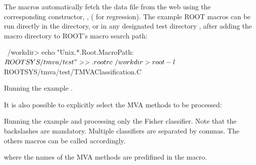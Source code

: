 The macros automatically fetch the data file from 
the web using the corresponding  constructor, \eg,
 ( for regression). The example %
ROOT macros can be run directly in the  directory,
or in any designated test directory , after adding the macro directory 
to ROOT's macro search path:
\begin{codeexample}
\begin{tmvacode}
~/workdir> echo "Unix.*.Root.MacroPath: $ROOTSYS/tmva/test" >> .rootrc
~/workdir> root -l $ROOTSYS/tmva/test/TMVAClassification.C
\end{tmvacode}
\caption[.]{\codeexampleCaptionSize Running the example .}
\end{codeexample}

It is also possible to explicitly select the MVA methods to be processed: 
\begin{codeexample}
\caption[.]{\codeexampleCaptionSize Running the example  
            and processing only the Fisher classifier. Note that
            the backslashes are mandatory. Multiple classifiers are separated by commas.
            The others macros can be 
            called accordingly. }
\end{codeexample}
where the names of the MVA methods are predifined in the macro. 

